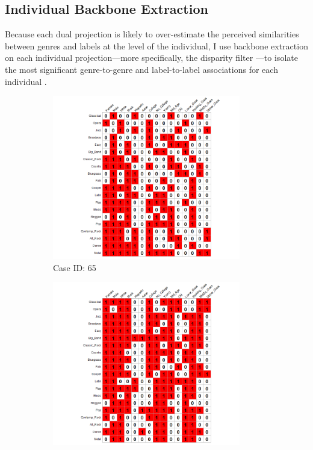 \documentclass[12pt]{article}
\begin{document}
\subsection*{Individual Backbone Extraction}
Because each dual projection is likely to over-estimate the perceived similarities between genres and labels at the level of the individual, I use backbone extraction on each individual projection---more specifically, the disparity filter \citep{serrano2009extracting-084}---to isolate the most significant genre-to-genre and label-to-label associations for each individual \citep{neal2014backbone-b29}. 

\begin{figure}[ht!]
    \captionsetup[subfigure]{font=footnotesize,labelfont=footnotesize}
    \centering
     \begin{subfigure}[b]{0.49\textwidth}
        \includegraphics[trim={4cm 0cm 3cm 0cm},clip, width=0.9\textwidth]{Plots/data-ex-af1.png}
            \caption{Case ID: 65}
            \label{fig:ind-ex-aff1}
    \end{subfigure}
     \begin{subfigure}[b]{0.49\textwidth}
        \includegraphics[trim={4cm 0cm 3cm 0cm},clip, width=0.9\textwidth]{Plots/data-ex-af2.png}

\end{subfigure}
\end{figure}
\end{document}
